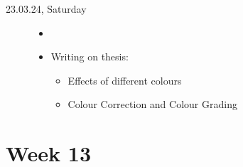 \documentclass[a4, 11pt]{scrartcl}
\begin{document}
\begin{description}
	
	
	
	
	
	
		
	
	
	\item[23.03.24, Saturday]
	\begin{itemize}
		\item[]
		
		\item Writing on thesis:
		
		\begin{itemize}
			\item Effects of different colours
			\item Colour Correction and Colour Grading
		\end{itemize}
		
	\end{itemize}	
	
	
	
	
	
\end{description}	













\newpage
\section*{Week 13}	
\end{document}
